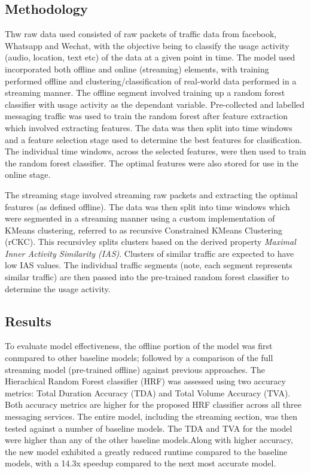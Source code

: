 \documentclass[10pt]{article}
\begin{document}
\subsection{Methodology}
Thw raw data used consisted of raw packets of traffic data from facebook, Whatsapp and Wechat, with the objective being to classify the usage activity (audio, location, text etc) of the data at a given point in time. The model used incorporated both offline and online (streaming) elements, with training performed offline and clustering/classification of real-world data performed in a streaming manner. The offline segment involved training up a random forest classifier with usage activity as the dependant variable. Pre-collected and labelled messaging traffic was used to train the random forest after feature extraction which involved extracting features. The data was then split into time windows and a feature selection stage used to determine the best features for clasification. The individual time windows, across the selected features, were then used to train the random forest classifier. The optimal features were also stored for use in the online stage.

The streaming stage involved streaming raw packets and extracting the optimal features (as defined offline). The data was then split into time windows which were segmented in a streaming manner using a custom implementation of KMeans clustering, referred to as recursive Constrained KMeans Clustering (rCKC). This recursivley splits clusters based on the derived property \textit{Maximal Inner Activity Similarity (IAS)}. Clusters of similar traffic are expected to have low IAS values. The individual traffic segments (note, each segment represents similar traffic) are then passed into the pre-trained random forest classifier to determine the usage activity.


\subsection{Results}
To evaluate model effectiveness, the offline portion of the model was first conmpared to other baseline models; followed by a comparison of the full streaming model (pre-trained offline) against previous approaches. The Hierachical Random Forest classifier (HRF) was assessed using two accuracy metrics: Total Duration Accuracy (TDA) and Total Volume Accuracy (TVA). Both accuracy metrics are higher for the proposed HRF classifier across all three messaging services. 
The entire model, including the streaming section, was then tested against a number of baseline models. The TDA and TVA for the model were higher than any of the other baseline models.Along with higher accuracy, the new model exhibited a greatly reduced runtime compared to the baseline models, with a 14.3x speedup compared to the next most accurate model. 
\end{document}
